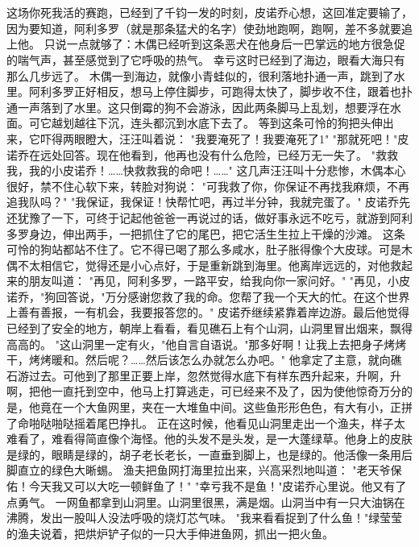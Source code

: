 \documentclass[12pt,UTF8]{ctexbook}
\begin{document}
\chapter{}

这场你死我活的赛跑，已经到了千钧一发的时刻，皮诺乔心想，这回准定要输了，因为要知道，阿利多罗（就是那条猛犬的名字）使劲地跑啊，跑啊，差不多就要追上他。
只说一点就够了：木偶已经听到这条恶犬在他身后一巴掌远的地方很急促的喘气声，甚至感觉到了它呼吸的热气。
幸亏这时已经到了海边，眼看大海只有那么几步远了。
木偶一到海边，就像小青蛙似的，很利落地扑通一声，跳到了水里。阿利多罗正好相反，想马上停住脚步，可跑得太快了，脚步收不住，跟着也扑通一声落到了水里。这只倒霉的狗不会游泳，因此两条脚马上乱划，想要浮在水面。可它越划越往下沉，连头都沉到水底下去了。
等到这条可怜的狗把头伸出来，它吓得两眼瞪大，汪汪叫着说：
"我要淹死了！我要淹死了1"
"那就死吧！"皮诺乔在远处回答。现在他看到，他再也没有什么危险，已经万无一失了。
"救救我，我的小皮诺乔！……快救救我的命吧！……"
这几声汪汪叫十分悲惨，木偶本心很好，禁不住心软下来，转脸对狗说：
"可我救了你，你保证不再找我麻烦，不再追我队吗？"
"我保证，我保证！快帮忙吧，再过半分钟，我就完蛋了。"
皮诺乔先还犹豫了一下，可终于记起他爸爸一再说过的话，做好事永远不吃亏，就游到阿利多罗身边，伸出两手，一把抓住了它的尾巴，把它活生生拉上干燥的沙滩。
这条可怜的狗站都站不住了。它不得已喝了那么多咸水，肚子胀得像个大皮球。可是木偶不太相信它，觉得还是小心点好，于是重新跳到海里。他离岸远远的，对他救起来的朋友叫道：
"再见，阿利多罗，一路平安，给我向你一家问好。"
"再见，小皮诺乔，"狗回答说，"万分感谢您救了我的命。您帮了我一个天大的忙。在这个世界上善有善报，一有机会，我要报答您的。"
皮诺乔继续紧靠着岸边游。最后他觉得已经到了安全的地方，朝岸上看看，看见礁石上有个山洞，山洞里冒出烟来，飘得高高的。
"这山洞里一定有火，"他自言自语说。"那多好啊！让我上去把身子烤烤干，烤烤暖和。然后呢？……然后该怎么办就怎么办吧。"
他拿定了主意，就向礁石游过去。可他到了那里正要上岸，忽然觉得水底下有样东西升起来，升啊，升啊，把他一直托到空中，他马上打算逃走，可已经来不及了，因为使他惊奇万分的是，他竟在一个大鱼网里，夹在一大堆鱼中间。这些鱼形形色色，有大有小，正拼了命啪哒啪哒摇着尾巴挣扎。
正在这时候，他看见山洞里走出一个渔夫，样子太难看了，难看得简直像个海怪。他的头发不是头发，是一大蓬绿草。他身上的皮肤是绿的，眼睛是绿的，胡子老长老长，一直垂到脚上，也是绿的。他活像一条用后脚直立的绿色大晰蜴。
渔夫把鱼网打海里拉出来，兴高采烈地叫道：
"老天爷保佑！今天我又可以大吃一顿鲜鱼了！"
"幸亏我不是鱼！"皮诺乔心里说。他又有了点勇气。
一网鱼都拿到山洞里。山洞里很黑，满是烟。山洞当中有一只大油锅在沸腾，发出一股叫人没法呼吸的烧灯芯气味。
"我来看看捉到了什么鱼！"绿莹莹的渔夫说着，把烘炉铲子似的一只大手伸进鱼网，抓出一把火鱼。
\end{document}
